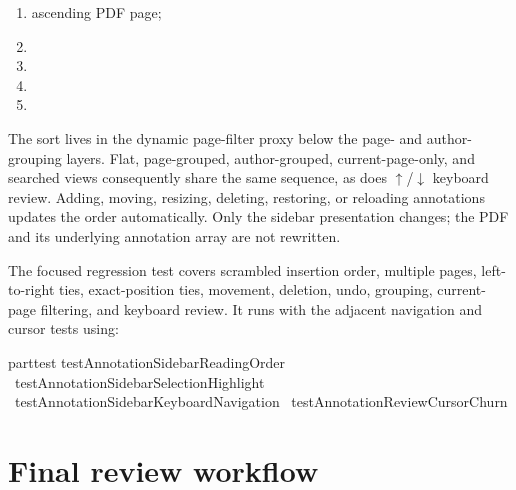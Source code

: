\begin{enumerate}
  \item ascending PDF page;
  \item {}
  \item {}
  \item {}
  \item {}
\end{enumerate}
The sort lives in the dynamic page-filter proxy below the page- and author-grouping layers.
Flat, page-grouped, author-grouped, current-page-only, and searched views consequently share the same sequence, as does \(\uparrow\)/\(\downarrow\) keyboard review.
Adding, moving, resizing, deleting, restoring, or reloading annotations updates the order automatically.
Only the sidebar presentation changes; the PDF and its underlying annotation array are not rewritten.

The focused regression test  covers scrambled insertion order, multiple pages, left-to-right ties, exact-position ties, movement, deletion, undo, grouping, current-page filtering, and keyboard review.
It runs with the adjacent navigation and cursor tests using:
\begin{DocCode}
parttest testAnnotationSidebarReadingOrder \
  testAnnotationSidebarSelectionHighlight \
  testAnnotationSidebarKeyboardNavigation \
  testAnnotationReviewCursorChurn
\end{DocCode}

\section*{Final review workflow}

